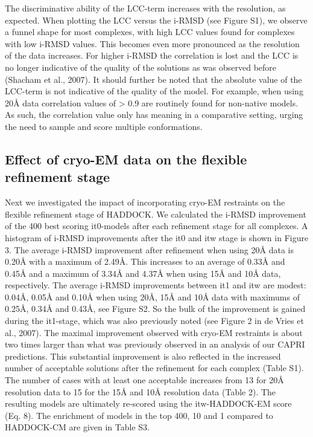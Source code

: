 The discriminative ability of the LCC-term increases with the resolution, as expected. When plotting the LCC versus the i-RMSD (see Figure S1), we observe a funnel shape for most complexes, with high LCC values found for complexes with low i-RMSD values. 
This becomes even more pronounced as the resolution of the data increases. For higher i-RMSD the correlation is lost and the LCC is no longer indicative of the quality of the solutions as was observed before (Shacham et al., 2007). 
It should further be noted that the absolute value of the LCC-term is not indicative of the quality of the model. 
For example, when using 20Å data correlation values of > 0.9 are routinely found for non-native models. As such, the correlation value only has meaning in a comparative setting, urging the need to sample and score multiple conformations. 

\subsection{Effect of cryo-EM data on the flexible refinement stage}

Next we investigated the impact of incorporating cryo-EM restraints on the flexible refinement stage of HADDOCK. We calculated the i-RMSD improvement of the 400 best scoring it0-models after each refinement stage for all complexes. A histogram of i-RMSD improvements after the it0 and itw stage is shown in Figure 3. The average i-RMSD improvement after refinement when using 20Å data is 0.20Å with a maximum of 2.49Å. This increases to an average of 0.33Å and 0.45Å and a maximum of 3.34Å and 4.37Å when using 15Å and 10Å data, respectively. The average i-RMSD improvements between it1 and itw are modest: 0.04Å, 0.05Å and 0.10Å when using 20Å, 15Å and 10Å data with maximums of 0.25Å, 0.34Å and 0.43Å, see Figure S2. So the bulk of the improvement is gained during the it1-stage, which was also previously noted (see Figure 2 in de Vries et al., 2007). The maximal improvement observed with cryo-EM restraints is about two times larger than what was previously observed in an analysis of our CAPRI predictions. This substantial improvement is also reflected in the increased number of acceptable solutions after the refinement for each complex (Table S1). The number of cases with at least one acceptable increases from 13 for 20Å resolution data to 15 for the 15Å and 10Å resolution data (Table 2). The resulting models are ultimately re-scored using the itw-HADDOCK-EM score (Eq. 8). The enrichment of models in the top 400, 10 and 1 compared to HADDOCK-CM are given in Table S3.

